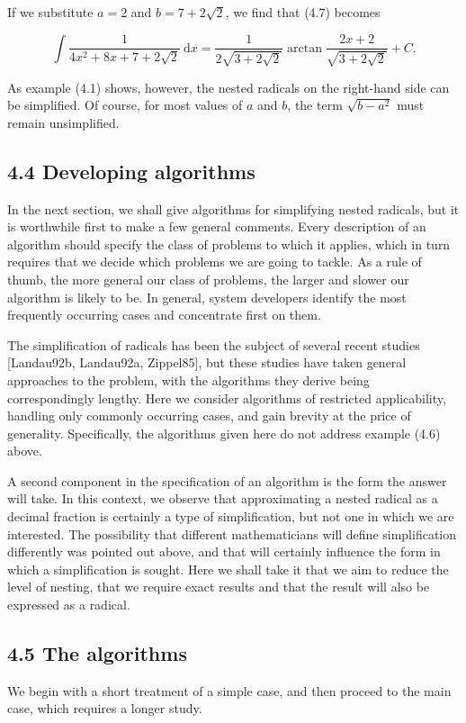 \documentclass[11pt,letterpaper]{article}
\begin{document}
If we substitute $a=2$ and $b=7+2 \sqrt{2}$, we find that (4.7) becomes

\[
\int \frac{1}{4 x^{2}+8 x+7+2 \sqrt{2}} \mathrm{~d} x=\frac{1}{2 \sqrt{3+2 \sqrt{2}}} \arctan \frac{2 x+2}{\sqrt{3+2 \sqrt{2}}}+C.
\]

As example (4.1) shows, however, the nested radicals on the right-hand side can be simplified. Of course, for most values of $a$ and $b$, the term $\sqrt{b-a^{2}}$ must remain unsimplified.

\subsection*{4.4 Developing algorithms}
In the next section, we shall give algorithms for simplifying nested radicals, but it is worthwhile first to make a few general comments. Every description of an algorithm should specify the class of problems to which it applies, which in turn requires that we decide which problems we are going to tackle. As a rule of thumb, the more general our class of problems, the larger and slower our algorithm is likely to be. In general, system developers identify the most frequently occurring cases and concentrate first on them.

The simplification of radicals has been the subject of several recent studies [Landau92b, Landau92a, Zippel85], but these studies have taken general approaches to the problem, with the algorithms they derive being correspondingly lengthy. Here we consider algorithms of restricted applicability, handling only commonly occurring cases, and gain brevity at the price of generality. Specifically, the algorithms given here do not address example (4.6) above.

A second component in the specification of an algorithm is the form the answer will take. In this context, we observe that approximating a nested radical as a decimal fraction is certainly a type of simplification, but not one in which we are interested. The possibility that different mathematicians will define simplification differently was pointed out above, and that will certainly influence the form in which a simplification is sought. Here we shall take it that we aim to reduce the level of nesting, that we require exact results and that the result will also be expressed as a radical.

\subsection*{4.5 The algorithms}
We begin with a short treatment of a simple case, and then proceed to the main case, which requires a longer study.
\end{document}
